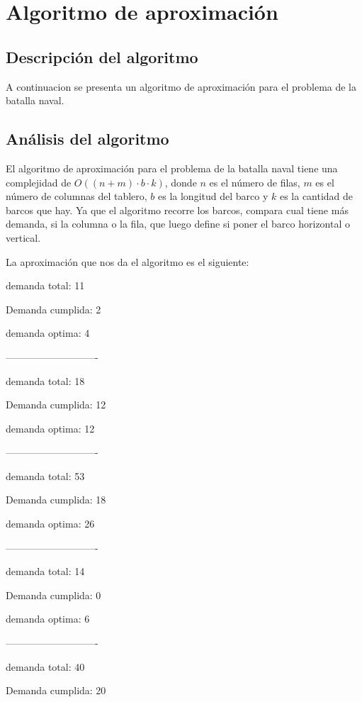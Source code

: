 \section{Algoritmo de aproximación}


\subsection{Descripción del algoritmo}

A continuacion se presenta un algoritmo de aproximación para el problema de la batalla naval.



\subsection{Análisis del algoritmo}

El algoritmo de aproximación para el problema de la batalla naval tiene una complejidad de $O((n + m) \cdot b \cdot k)$, donde $n$ es el número de filas, $m$ es el número de columnas del tablero, $b$ es la longitud del barco y $k$ es la cantidad de barcos que hay. Ya que el algoritmo recorre los barcos, compara cual tiene más demanda, si la columna o la fila, que luego define si poner el barco horizontal o vertical. 

La aproximación que nos da el algoritmo es el siguiente:

demanda total:  11

Demanda cumplida:  2

demanda optima: 4

----------------------------

demanda total:  18

Demanda cumplida:  12

demanda optima: 12

----------------------------

demanda total:  53

Demanda cumplida:  18

demanda optima: 26

----------------------------

demanda total:  14

Demanda cumplida:  0

demanda optima: 6

----------------------------

demanda total:  40

Demanda cumplida:  20

